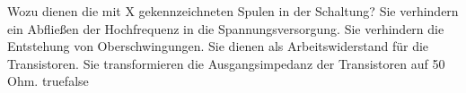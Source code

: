     {Wozu dienen die mit X gekennzeichneten Spulen in der Schaltung?}
    {Sie verhindern ein Abfließen der Hochfrequenz in die Spannungsversorgung.}
    {Sie verhindern die Entstehung von Oberschwingungen.}
    {Sie dienen als Arbeitswiderstand für die Transistoren.}
    {Sie transformieren die Ausgangsimpedanz der Transistoren auf 50 Ohm.}
    {true}{false}
